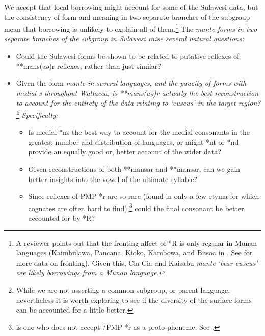 We accept that local borrowing might account for some of the
Sulawesi data, but the consistency of form
and meaning in two separate branches of the 
subgroup \citep{vandenBerg2003} mean that borrowing is unlikely
to explain all of them.\footnote{
		A reviewer points out that the
		fronting affect of *R is only regular in Munan languages (Kaimbulawa,
		Pancana, Kioko, Kambowa, and Busoa in .
		See  for more data on fronting).
		Given this, Cia-Cia and Kaisabu \it{mante} ‘bear cuscus’ are
		likely borrowings from a Munan language.}
The \it{mante} forms
in two separate branches of the  subgroup in
Sulawesi raise several natural questions:

\begin{itemize}
	\item	Could the Sulawesi forms be shown to be related to putative
				reflexes of **mans(aə)r reflexes,
				rather than just similar?
	\item	Given the form \it{mante} in several languages,
				and the paucity of forms with medial \it{s} throughout
				Wallacea, is **mans(aə)r actually the best reconstruction to account for
				the entirety of the data relating to ‘cuscus’ in the target region?\footnote{
						While we are not asserting a common subgroup, or parent language,
						nevertheless it is worth exploring to see if the diversity of
						the surface forms can be accounted for a little better.}
				Specifically:
					\begin{itemize}
						\item	Is medial *ns the best way to account for the medial consonants
									in the greatest number
									and distribution of languages,
									or might *nt or *nd provide an equally good or,
									better account of the wider data?
						\item	Given reconstructions of both **mansar
									and **mansər, can we gain better insights into the vowel of the
									ultimate syllable? \item	Since reflexes of PMP *r are so rare (found in only a few
									etyma for which cognates are often hard to find),\footnote{
											\citet{Wolff2010}	is one who does not accept /PMP *r
											as a proto-phoneme. See .}
									could the final consonant be better accounted
									for by *R?
					\end{itemize}
\end{itemize}